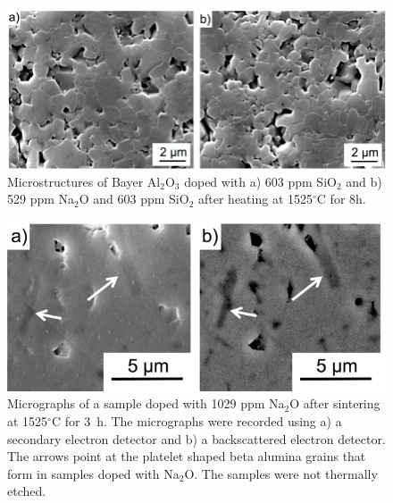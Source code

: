 \newpage
\begin{figure}[H]
	\centering
	\includegraphics[width=\textwidth]{Chapter-3/Figures/Figure7.png}
	\caption{Microstructures of Bayer Al$_{2}$O$_{3}$ doped with a) 603 ppm SiO$_{2}$ and b) 529 ppm Na$_{2}$O and 603 ppm SiO$_{2}$ after heating at 1525$^{\circ}$C for 8h.}
	\label{Ch3-figure:Figure7}
\end{figure}

\newpage
\begin{figure}[H]
	\centering
	\includegraphics[width=\textwidth]{Chapter-3/Figures/Figure8.png}
	\caption{Micrographs of a sample doped with 1029 ppm Na$_{2}$O after sintering at 1525$^{\circ}$C for 3 h. The micrographs were recorded using a) a secondary electron detector and b) a backscattered electron detector. The arrows point at the platelet shaped beta alumina grains that form in samples doped with Na$_{2}$O. The samples were not thermally etched.}
	\label{Ch3-figure:Figure8}
\end{figure}

